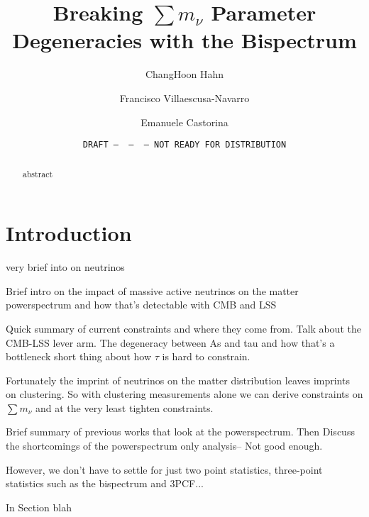 \documentclass[12pt, letterpaper, preprint]{aastex62}
\newcommand{\smnu}{\sum m_\nu}
\begin{document}
\sloppy\sloppypar\frenchspacing 

\title{Breaking $\smnu$ Parameter Degeneracies with the Bispectrum} 
\date{\texttt{DRAFT~---~\githash~---~\gitdate~---~NOT READY FOR DISTRIBUTION}}

\author{ChangHoon Hahn}

\author{Francisco Villaescusa-Navarro} 

\author{Emanuele Castorina} 

\begin{abstract}
    abstract
\end{abstract}


\section{Introduction}
very brief into on neutrinos

Brief intro on the impact of massive active neutrinos on the matter powerspectrum 
and how that's detectable with CMB and LSS


Quick summary of current constraints and where they come from. Talk about the 
CMB-LSS lever arm. The degeneracy between As and tau and how that's a bottleneck
short thing about how $\tau$ is hard to constrain.

Fortunately the imprint of neutrinos on the matter distribution leaves imprints
on clustering. So with clustering measurements alone we can derive constraints 
on $\smnu$ and at the very least tighten constraints.  

Brief summary of previous works that look at the powerspectrum. Then Discuss the 
shortcomings of the powerspectrum only analysis-- Not good enough. 

However, we don't have to settle for just two point statistics, three-point 
statistics such as the bispectrum and 3PCF... 

In Section blah 
\end{document}
